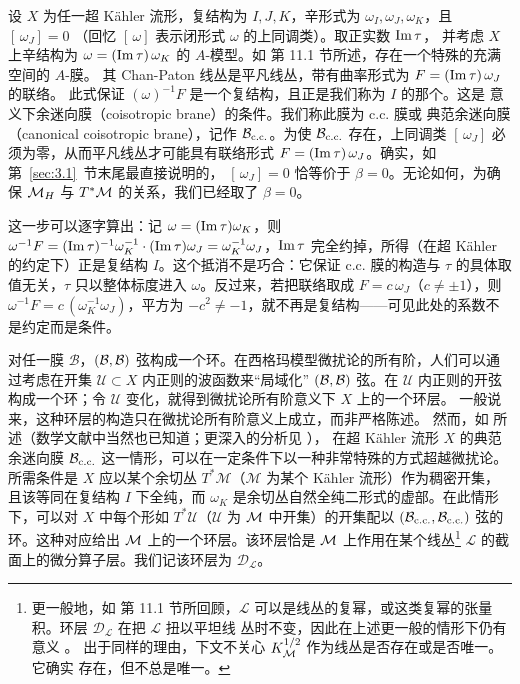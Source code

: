 设 $X$ 为任一超 Kähler 流形，复结构为 $I,J,K$，辛形式为
$\omega_I,\omega_J,\omega_K$，且 $[\,\omega_J]=0$
（回忆 $[\,\omega]$ 表示闭形式 $\omega$ 的上同调类）。取正实数 ${\rm Im}\,\tau$，
并考虑 $X$ 上辛结构为 $\omega=({\rm Im}\,\tau)\,\omega_K$ 的 $A$-模型。如 \cite{ref8} 第 11.1 节所述，存在一个特殊的充满空间的 $A$-膜。
其 Chan-Paton 线丛是平凡线丛，带有曲率形式为
$F=({\rm Im}\,\tau)\,\omega_J$ 的联络。
此式保证 $(\omega)^{-1}F$ 是一个复结构，且正是我们称为 $I$ 的那个。这是
\cite{ref72} 意义下余迷向膜（coisotropic brane）的条件。我们称此膜为 c.c. 膜或
典范余迷向膜（canonical coisotropic brane），记作 ${\mathcal B}_{\rm c.c.}$。为使
${\mathcal B}_{\rm c.c.}$ 存在，上同调类
$[\,\omega_J]$ 必须为零，从而平凡线丛才可能具有联络形式
$F=({\rm Im}\,\tau)\,\omega_J$。确实，如第~\ref{sec:3.1}~节末尾最直接说明的，
$[\,\omega_J]=0$ 恰等价于 $\beta=0$。无论如何，为确保 ${{\mathcal{M}}_H}$ 与
$T^*{\mathcal{M}}$ 的关系，我们已经取了 $\beta=0$。

\begin{yizhu}[易错点]
这一步可以逐字算出：记 $\omega=({\rm Im}\,\tau)\omega_K$，则 $\omega^{-1}F=({\rm Im}\,\tau)^{-1}\omega_K^{-1}\cdot({\rm Im}\,\tau)\omega_J=\omega_K^{-1}\omega_J$，${\rm Im}\,\tau$ 完全约掉，所得（在超 Kähler 的约定下）正是复结构 $I$。这个抵消不是巧合：它保证 c.c. 膜的构造与 $\tau$ 的具体取值无关，$\tau$ 只以整体标度进入 $\omega$。反过来，若把联络取成 $F=c\,\omega_J$（$c\ne\pm1$），则 $\omega^{-1}F=c\,(\omega_K^{-1}\omega_J)$，平方为 $-c^2\ne-1$，就不再是复结构——可见此处的系数不是约定而是条件。
\end{yizhu}

对任一膜 $\mathcal B$，$({\mathcal B},{\mathcal B})$ 弦构成一个环。在西格玛模型微扰论的所有阶，人们可以通过考虑在开集 ${\mathcal U}\subset X$ 内正则的波函数来“局域化”
$({\mathcal B},{\mathcal B})$ 弦。在 ${\mathcal U}$ 内正则的开弦构成一个环；令 ${\mathcal U}$ 变化，就得到微扰论所有阶意义下 $X$ 上的一个环层。
一般说来，这种环层的构造只在微扰论所有阶意义上成立，而非严格陈述。
然而，如 \cite{ref8} 所述（数学文献中当然也已知道；更深入的分析见 \cite{ref73}），
在超 Kähler 流形 $X$ 的典范余迷向膜
${\mathcal B}_{\rm c.c.}$ 这一情形，可以在一定条件下以一种非常特殊的方式超越微扰论。所需条件是 $X$
应以某个余切丛 $T^*{\mathcal M}$（${\mathcal M}$ 为某个 Kähler 流形）作为稠密开集，
且该等同在复结构 $I$ 下全纯，而 $\omega_K$ 是余切丛自然全纯二形式的虚部。在此情形下，可以对 $X$ 中每个形如 $T^*{\mathcal U}$（${\mathcal U}$ 为
${\mathcal{M}}$ 中开集）的开集配以 $({\mathcal B}_{\rm c.c.},{\mathcal B}_{\rm c.c.})$ 弦的环。这种对应给出 ${\mathcal{M}}$ 上的一个环层。该环层恰是
${\mathcal{M}}$ 上作用在某个线丛\footnote{更一般地，如 \cite{ref8} 第 11.1 节所回顾，${\mathcal L}$ 可以是线丛的复幂，或这类复幂的张量积。环层 ${\mathcal
D}_{\mathcal L}$ 在把 ${\mathcal L}$ 扭以平坦线
丛时不变，因此在上述更一般的情形下仍有意义
\cite{ref74}。
出于同样的理由，下文不关心
$K_{\mathcal{M}}^{1/2}$ 作为线丛是否存在或是否唯一。它确实
存在，但不总是唯一。} $\mathcal L$ 的截面上的微分算子层。我们记该环层为 ${\mathcal
D}_{\mathcal L}$。

